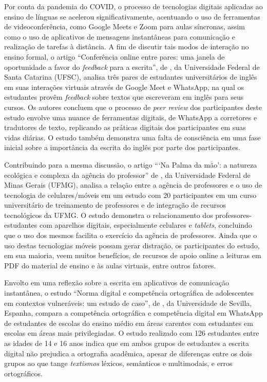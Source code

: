 \documentclass[portuguese]{textolivre}
\begin{document}
Por conta da pandemia do COVID, o processo de tecnologias digitais aplicadas ao ensino de línguas se acelerou significativamente, acentuando o uso de ferramentas de videoconferência, como Google Meets e Zoom para aulas síncronas, assim como o uso de aplicativos de mensagens instantâneas para comunicação e realização de tarefas à distância. A fim de discutir tais modos de interação no ensino formal, o artigo “Conferência online entre pares: uma janela de oportunidade a favor do \textit{feedback} para a escrita”, de \textcite{xhafaj_online_2024}, da Universidade Federal de Santa Catarina (UFSC), analisa três pares de estudantes universitários de inglês em suas interações virtuais através de Google Meet e WhatsApp, na qual os estudantes provêm \textit{feedback} sobre textos que escreveram em inglês para seus cursos. Os autores concluem que o processo de \textit{peer review} dos participantes deste estudo envolve uma nuance de ferramentas digitais, de WhatsApp a corretores e tradutores de texto, replicando as práticas digitais dos participantes em suas vidas diárias. O estudo também demonstra uma falta de consciência em uma fase inicial sobre a importância da escrita do inglês por parte dos participantes. 

Contribuindo para a mesma discussão, o artigo “‘Na Palma da mão’: a natureza ecológica e complexa da agência do professor” de \textcite{braga_palm_2024}, da Universidade Federal de Minas Gerais (UFMG), analisa a relação entre a agência de professores e o uso de tecnologia de celulares/móveis em um estudo com 20 participantes em um curso universitário de treinamento de professores e de integração de recursos tecnológicos da UFMG. O estudo demonstra o relacionamento dos professores-estudantes com aparelhos digitais, especialmente celulares e \textit{tablets}, concluindo que o uso dos mesmos facilita o exercício da agência de professores. Ainda que o uso destas tecnologias móveis possam gerar distração, os participantes do estudo, em sua maioria, veem muitos benefícios, de recursos de apoio online a leituras em PDF do material de ensino e às aulas virtuais, entre outros fatores.

Envolto em uma reflexão sobre a escrita em aplicativos de comunicação instantânea, o estudo “Norma digital e competência ortográfica de adolescentes em contextos vulneráveis: um estudo de caso”, de \textcite{fernandez-julia_norma_2024}, da Universidade de Sevilla, Espanha, compara a competência ortográfica e competência digital em WhatsApp de estudantes de escolas do ensino médio em áreas carentes com estudantes em escolas em áreas mais privilegiadas. O estudo realizado com 126 estudantes entre as idades de 14 e 16 anos indica que em ambos grupos de estudantes a escrita digital não prejudica a ortografia acadêmica, apesar de diferenças entre os dois grupos ao que tange \textit{textismos} léxicos, semânticos e multimodais, e erros ortográficos.
\end{document}
